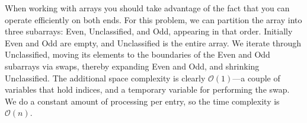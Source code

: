 \documentclass[10pt,openany,twoside,letterpaper,extrafontsizes]{memoir}
\newif\ifCpp
\newif\ifJava
\newif\ifPython
\begin{document}
\begin{Spacing}{\arraysSpacing}
When working with arrays you should take advantage of the fact that you can operate
efficiently on both ends.
For this problem, we can partition the array into three subarrays: Even, Unclassified, and Odd, appearing in that order.
Initially Even and Odd are empty, and Unclassified is the entire array. We iterate through Unclassified,
moving its elements to the boundaries of the Even and Odd subarrays via swaps, thereby expanding Even and Odd, and
shrinking Unclassified.
\ifCpp
\begin{lstlisting}[language={[11]C++}]
void EvenOdd(vector<int>* A_ptr) {
  vector<int>& A = *A_ptr;
  int next_even = 0, next_odd = A.size() - 1;
  while (next_even < next_odd) {
    if (A[next_even] % 2 == 0) {
      ++next_even;
    } else {
      swap(A[next_even], A[next_odd--]);
    }
  }
}
\end{lstlisting}
\fi%
\ifJava
\begin{lstlisting}[language=Java]
public static void evenOdd(int[] A) {
  int nextEven = 0, nextOdd = A.length - 1;
  while (nextEven < nextOdd) {
    if (A[nextEven] % 2 == 0) {
      nextEven++;
    } else {
      int temp = A[nextEven];
      A[nextEven] = A[nextOdd];
      A[nextOdd--] = temp;
    }
  }
}
\end{lstlisting}
\fi%
\ifPython
\begin{lstlisting}[language=Python]
def even_odd(A):
    next_even, next_odd = 0, len(A) - 1
    while next_even < next_odd:
        if A[next_even] % 2 == 0:
            next_even += 1
        else:
            A[next_even], A[next_odd] = A[next_odd], A[next_even]
            next_odd -= 1
\end{lstlisting}
\fi%
The additional space complexity is clearly $\mathcal{O}(1)$---a couple of variables that hold indices,
and a temporary variable for performing the swap. We do a
constant amount of processing per entry, so the time complexity is $\mathcal{O}(n)$.


\end{Spacing}
\end{document}
